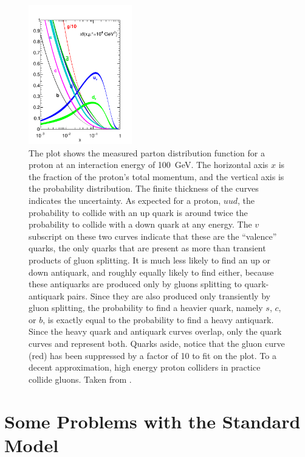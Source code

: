   \begin{figure}[h!]
    \centering
    \includegraphics[width=0.4\textwidth]{figures/parton_distribution_function.pdf}
    \caption[Proton parton distribution function.]{
      The plot shows the measured parton distribution function for a proton at an interaction energy of 100~GeV.
      The horizontal axis $x$ is the fraction of the proton's total momentum, and the vertical axis is the probability distribution.
      The finite thickness of the curves indicates the uncertainty.
      As expected for a proton, $uud$, the probability to collide with an up quark is around twice the probability to collide with a down quark at any energy.
      The $v$ subscript on these two curves indicate that these are the ``valence'' quarks, the only quarks that are present as more than transient products of gluon splitting.
      It is much less likely to find an up or down antiquark, and roughly equally likely to find either, because these antiquarks are produced only by gluons splitting to quark-antiquark pairs.
      Since they are also produced only transiently by gluon splitting, the probability to find a heavier quark, namely $s$, $c$, or $b$, is exactly equal to the probability to find a heavy antiquark.
      Since the heavy quark and antiquark curves overlap, only the quark curves and represent both.
      Quarks aside, notice that the gluon curve (red) has been suppressed by a factor of 10 to fit on the plot.
      To a decent approximation, high energy proton colliders in practice collide gluons.
      Taken from \cite{PDFs}.}
    \label{fig:PDF}
  \end{figure}  


\section{Some Problems with the Standard Model} \label{sec:SMproblems}

